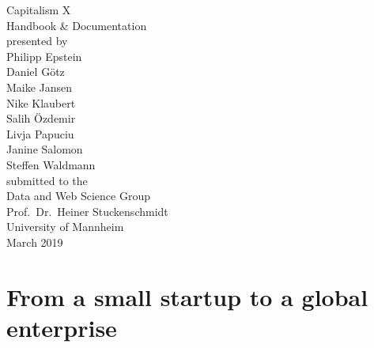 \documentclass[11pt,titlepage,oneside,openany]{book}
\begin{document}
\begin{titlepage}
	\vspace*{2cm}
  \begin{center}
   {\Large Capitalism X\\}
   \vspace{2cm} 
   {Handbook \& Documentation\\}
   \vspace{2cm}
   {presented by\\
   Philipp Epstein \\
    Daniel G\"otz \\
Maike Jansen \\
Nike Klaubert \\
Salih \"Ozdemir \\
Livja Papuciu \\
Janine Salomon \\
Steffen Waldmann \\
   }
   \vspace{1cm} 
   {submitted to the\\
    Data and Web Science Group\\
    Prof.\ Dr.\ Heiner Stuckenschmidt\\
    University of Mannheim\\} \vspace{2cm}
   {March 2019}
  \end{center}
\end{titlepage} 

\tableofcontents
\newpage
\printglossary[style=long]
\listoffigures

\listoftables


\newpage

\chapter{From a small startup to a global enterprise}
\label{cha:intro}
\end{document}
